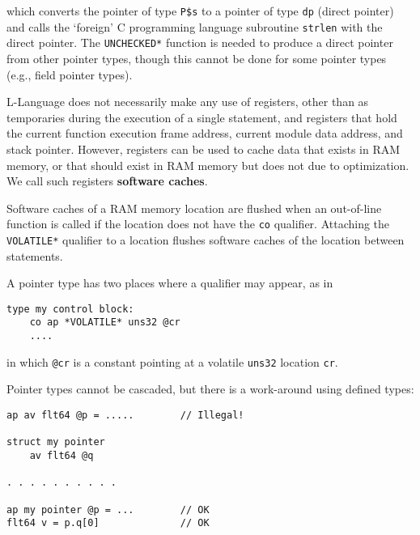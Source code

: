 \documentclass[12pt]{article}
\newcommand{\skey}[2]{{\rm \bfseries #1#2}}
\newenvironment{indpar}[1][0.3in]%
	{\begin{list}{}%
		     {\setlength{\itemsep}{0in}%
		      \setlength{\topsep}{0in}%
		      \setlength{\parsep}{1ex}%
		      \setlength{\labelwidth}{#1}%
		      \setlength{\leftmargin}{#1}%
		      \addtolength{\leftmargin}{\labelsep}}%
	 \item}%
	{\end{list}}
\begin{document}
which converts the pointer of type {\tt P\$s} to a pointer of
type {\tt dp} (direct pointer) and calls the `foreign' C programming
language subroutine {\tt strlen} with the direct pointer.
The {\tt *UNCHECKED*} function is needed to produce a direct pointer
from other pointer types, though this cannot be done for some pointer types
(e.g., field pointer types).

L-Language does not necessarily make any use of registers, other
than as temporaries during the execution of a single statement,
and registers that hold the current function
execution frame address, current module data address, and stack pointer.
However, registers can be used to cache data that exists in
RAM memory, or that should exist in RAM memory but does not
due to optimization.  We call such registers
\skey{software cach}{es}.

Software caches of a RAM memory location are flushed when an out-of-line
function is called if the location does not have the {\tt co} qualifier.
Attaching the {\tt *VOLATILE*} qualifier to a location
flushes software caches of the location between statements.

A pointer type
has two places where a qualifier may appear, as in

\begin{indpar}\begin{verbatim}
type my control block:
    co ap *VOLATILE* uns32 @cr
    ....
\end{verbatim}\end{indpar}
in which {\tt @cr} is a constant pointing at a volatile
{\tt uns32} location {\tt cr}.

Pointer types cannot be cascaded, but there is a work-around
using defined types:
\begin{indpar}\begin{verbatim}
ap av flt64 @p = .....        // Illegal!

struct my pointer
    av flt64 @q

. . . . . . . . . .

ap my pointer @p = ...        // OK
flt64 v = p.q[0]              // OK
\end{verbatim}\end{indpar}
\end{document}
